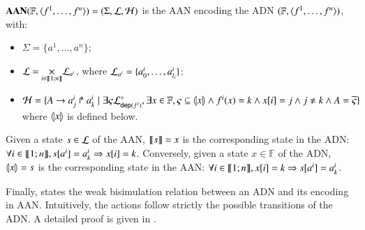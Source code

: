 \begin{definition}
\label{def:DN2PH}
  $\toPH\DNdef=(\Sigma,\PHl,\Hits)$ is the AAN encoding the ADN $\DNdef$, with:
  \begin{itemize}
    \item $\Sigma = \{ a^1, \dots, a^n \}$;
    
    \item $\PHl=\underset{i\in\segm{1}{n}}{\times} \PHl_{a^i}$, where
      $\PHl_{a^i}=\{a^i_0, \dots, a^i_{l_i}\}$;
    
    \item $\PHh = \{ \PHfrappe{A}{a^i_j}{a^i_k} \mid
      \exists \varsigma \PHsubl[\PHl]_{\DNdep(f^i)}, \exists x \in \mathbb{F},
      \varsigma \subseteq \encode{x} \wedge
      f^i(x) = k \wedge \PHget{x}{i} = j \wedge j \neq k \wedge
      A = \toset{\varsigma} \}$ where $\encode{x}$ is defined below.
    
% 
  \end{itemize}
  Given a state $s \in \PHl$ of the AAN,
  $\decode s=x$ is the corresponding state in the ADN:
  $\forall i\in\segm{1}{n}, \get{s}{a^i}=a^i_k \Rightarrow \get{x}{i}=k$.
  Conversely, given a state $x\in \mathbb F$ of the ADN, 
  $\encode x=s$ is the corresponding state in the AAN:
  $\forall i\in\segm{1}{n}, \get{x}{i}=k \Rightarrow \get{s}{a^i}=a^i_k$.
\end{definition}

Finally,
 states the weak bisimulation relation between an ADN and its encoding in AAN.
Intuitively, the actions follow strictly the possible transitions of the ADN.
A detailed proof is given in .

